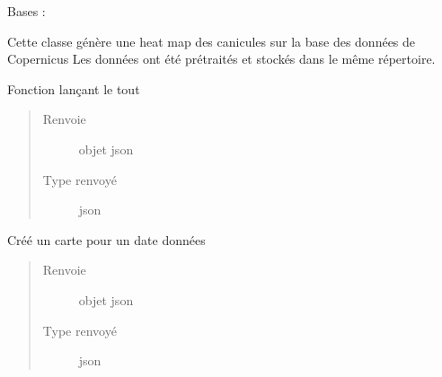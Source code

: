 \documentclass[letterpaper,10pt,french]{sphinxmanual}
\begin{document}
\begin{fulllineitems}
\label{\detokenize{app.home.content_gen:app.home.content_gen.map_generation.CaniculePlot}}
\sphinxAtStartPar
Bases : 

\sphinxAtStartPar
Cette classe génère une heat map des canicules sur la base des données de Copernicus
Les données ont été pré\sphinxhyphen{}traités et stockés dans le même répertoire.

\begin{fulllineitems}
\label{\detokenize{app.home.content_gen:app.home.content_gen.map_generation.CaniculePlot.main}}
\sphinxAtStartPar
Fonction lançant le tout
\begin{quote}\begin{description}
\item[{Renvoie}] \leavevmode
\sphinxAtStartPar
objet json

\item[{Type renvoyé}] \leavevmode
\sphinxAtStartPar
json

\end{description}\end{quote}

\end{fulllineitems}


\begin{fulllineitems}
\label{\detokenize{app.home.content_gen:app.home.content_gen.map_generation.CaniculePlot.plot_at_date}}
\sphinxAtStartPar
Créé un carte pour un date données
\begin{quote}\begin{description}
\item[{Renvoie}] \leavevmode
\sphinxAtStartPar
objet json

\item[{Type renvoyé}] \leavevmode
\sphinxAtStartPar
json


\end{description}
\end{quote}
\end{fulllineitems}
\end{fulllineitems}
\end{document}
